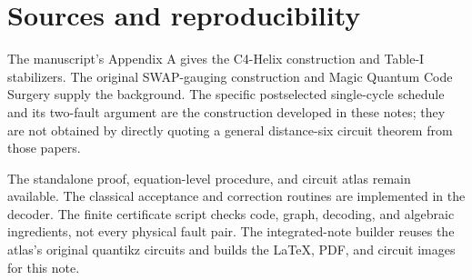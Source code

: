 \documentclass[11pt]{article}
\begin{document}
\section{Sources and reproducibility}
The manuscript's Appendix A gives the C4-Helix construction and Table-I stabilizers. The original SWAP-gauging construction and Magic Quantum Code Surgery supply the background. The specific postselected single-cycle schedule and its two-fault argument are the construction developed in these notes; they are not obtained by directly quoting a general distance-six circuit theorem from those papers.

The standalone proof, equation-level procedure, and circuit atlas remain available. The classical acceptance and correction routines are implemented in the decoder. The finite certificate script checks code, graph, decoding, and algebraic ingredients, not every physical fault pair. The integrated-note builder reuses the atlas's original quantikz circuits and builds the LaTeX, PDF, and circuit images for this note.
\end{document}
